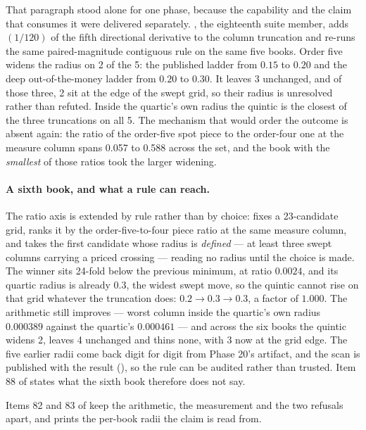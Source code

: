 \documentclass[11pt,a4paper]{article}
\begin{document}
That paragraph stood alone for one phase, because the capability and the claim that consumes it were
delivered separately. , the eighteenth suite member,
adds $(1/120)$ of the fifth directional derivative to the column truncation and re-runs the same
paired-magnitude contiguous rule on the same five books. Order five widens the radius on 2 of the 5: the
published ladder from $0.15$ to $0.20$ and the deep out-of-the-money ladder from $0.20$ to $0.30$. It
leaves 3 unchanged, and of those three, 2 sit at the edge of the swept grid, so their radius is
unresolved rather than refuted. Inside the quartic's own radius the quintic is the closest of the three
truncations on all 5. The mechanism that would order the outcome is absent again: the ratio of the
order-five spot piece to the order-four one at the measure column spans 0.057 to 0.588 across the set,
and the book with the \emph{smallest} of those ratios took the larger widening.

\paragraph{A sixth book, and what a rule can reach.} The ratio axis is extended by rule rather than by
choice:  fixes a 23-candidate grid, ranks it by the
order-five-to-four piece ratio at the same measure column, and takes the first candidate whose radius is
\emph{defined} --- at least three swept columns carrying a priced crossing --- reading no radius until the
choice is made. The winner sits 24-fold below the previous minimum, at ratio $0.0024$, and its quartic
radius is already $0.3$, the widest swept move, so the quintic cannot rise on that grid whatever the
truncation does: $0.2 \to 0.3 \to 0.3$, a factor of $1.000$. The arithmetic still improves --- worst
column inside the quartic's own radius $0.000389$ against the quartic's $0.000461$ --- and across the six
books the quintic widens 2, leaves 4 unchanged and thins none, with 3 now at the grid edge. The five
earlier radii come back digit for digit from Phase 20's artifact, and the scan is published with the
result (), so the rule can be
audited rather than trusted. Item 88 of  states
what the sixth book therefore does not say.

Items 82 and 83 of
 keep the arithmetic, the measurement and the two refusals apart, and
 prints the per-book radii the claim is read from.
\end{document}
